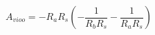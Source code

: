 \begin{equation}
A_{vi oo} = - R_{a} R_{s} \left(- \frac{1}{R_{b} R_{s}} - \frac{1}{R_{a} R_{s}}\right)
\end{equation}

